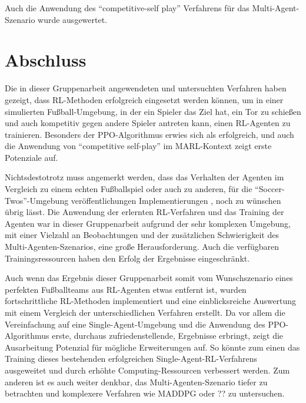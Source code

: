\documentclass[twocolumn]{webofc}
\begin{document}
Auch die Anwendung des \enquote{competitive-self play} Verfahrens für das Multi-Agent-Szenario wurde ausgewertet.



\section{Abschluss} \label{sec-3}

Die in dieser Gruppenarbeit angewendeten und untersuchten Verfahren haben gezeigt, dass \ac{RL}-Methoden erfolgreich eingesetzt werden können, um in einer simulierten Fußball-Umgebung, in der ein Spieler das Ziel hat, ein Tor zu schießen und auch kompetitiv gegen andere Spieler antreten kann, einen \ac{RL}-Agenten zu trainieren. Besonders der \ac{PPO}-Algorithmus erwies sich als erfolgreich, und auch die Anwendung von \enquote{competitive self-play} im \ac{MARL}-Kontext zeigt erste Potenziale auf.

Nichtsdestotrotz muss angemerkt werden, dass das Verhalten der Agenten im Vergleich zu einem echten Fußballspiel oder auch zu anderen, für die \enquote{Soccer-Twos}-Umgebung veröffentlichungen Implementierungen \cite{todo}, noch zu wünschen übrig lässt. Die Anwendung der erlernten \ac{RL}-Verfahren und das Training der Agenten war in dieser Gruppenarbeit aufgrund der sehr komplexen Umgebung, mit einer Vielzahl an Beobachtungen und der zusätzlichen Schwierigkeit des Multi-Agenten-Szenarios, eine große Herausforderung. Auch die verfügbaren Trainingsressourcen haben den Erfolg der Ergebnisse eingeschränkt.

Auch wenn das Ergebnis dieser Gruppenarbeit somit vom Wunschszenario eines perfekten Fußballteams aus \ac{RL}-Agenten etwas entfernt ist, wurden fortschrittliche \ac{RL}-Methoden implementiert und eine einblicksreiche Auswertung mit einem Vergleich der unterschiedlichen Verfahren erstellt. Da vor allem die Vereinfachung auf eine Single-Agent-Umgebung und die Anwendung des \ac{PPO}-Algorithmus erste, durchaus zufriedenstellende, Ergebnisse erbringt, zeigt die Ausarbeitung Potenzial für mögliche Erweiterungen auf. So könnte zum einen das Training dieses bestehenden erfolgreichen Single-Agent-RL-Verfahrens ausgeweitet und durch erhöhte Computing-Ressourcen verbessert werden. Zum anderen ist es auch weiter denkbar, das Multi-Agenten-Szenario tiefer zu betrachten und komplexere Verfahren wie MADDPG oder ?? zu untersuchen.


%

\end{document}
